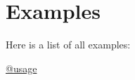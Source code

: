 \section{Examples}
Here is a list of all examples\+:\begin{DoxyCompactItemize}
\item 
\hyperlink{_0Dusage-example}{@usage}
\end{DoxyCompactItemize}
